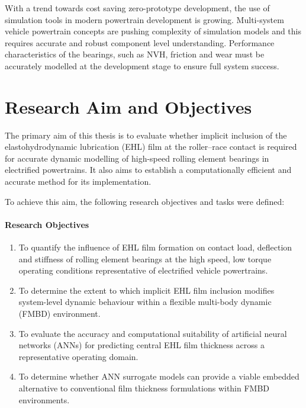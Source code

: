 With a trend towards cost saving zero-prototype development, the use of simulation tools in modern powertrain development is growing. Multi-system vehicle powertrain concepts are pushing complexity of simulation models and this requires accurate and robust component level understanding. Performance characteristics of the bearings, such as NVH, friction and wear must be accurately modelled at the development stage to ensure full system success.

\section{Research Aim and Objectives} \label{Research Questions}

The primary aim of this thesis is to evaluate whether implicit inclusion of the elastohydrodynamic lubrication (EHL) film at the roller–race contact is required for accurate dynamic modelling of high-speed rolling element bearings in electrified powertrains. It also aims to establish a computationally efficient and accurate method for its implementation.

To achieve this aim, the following research objectives and tasks were defined: 
\paragraph{Research Objectives}
\begin{enumerate}
	\item To quantify the influence of EHL film formation on contact load, deflection and stiffness of rolling element bearings at the high speed, low torque operating conditions representative of electrified vehicle powertrains. 
	\item To determine the extent to which implicit EHL film inclusion modifies system-level dynamic behaviour within a flexible multi-body dynamic (FMBD) environment.
	\item To evaluate the accuracy and computational suitability of artificial neural networks (ANNs) for predicting central EHL film thickness across a representative operating domain.
	\item To determine whether ANN surrogate models can provide a viable embedded alternative to conventional film thickness formulations within FMBD environments.
\end{enumerate}

